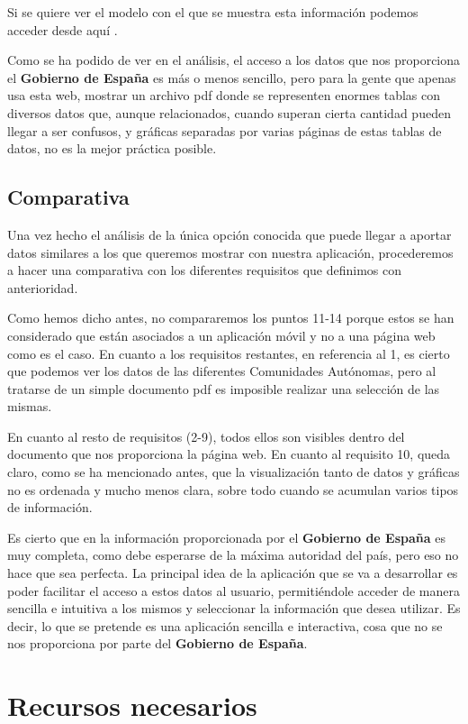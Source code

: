 Si se quiere ver el modelo con el que se muestra esta información podemos acceder desde aquí \cite{actualizacion-gob}.

Como se ha podido de ver en el análisis, el acceso a los datos que nos proporciona el \textbf{Gobierno de España} es más o menos sencillo, pero para la gente que apenas usa esta web, mostrar un archivo pdf donde se representen enormes tablas con diversos datos que, aunque relacionados, cuando superan cierta cantidad pueden llegar a ser confusos, y gráficas separadas por varias páginas de estas tablas de datos, no es la mejor práctica posible.

\subsection{Comparativa}

Una vez hecho el análisis de la única opción conocida que puede llegar a aportar datos similares a los que queremos mostrar con nuestra aplicación, procederemos a hacer una comparativa con los diferentes requisitos que definimos con anterioridad.

Como hemos dicho antes, no compararemos los puntos 11-14 porque estos se han considerado que están asociados a un aplicación móvil y no a una página web como es el caso. En cuanto a los requisitos restantes, en referencia al 1, es cierto que podemos ver los datos de las diferentes Comunidades Autónomas, pero al tratarse de un simple documento pdf es imposible realizar una selección de las mismas.

En cuanto al resto de requisitos (2-9), todos ellos son visibles dentro del documento que nos proporciona la página web. En cuanto al requisito 10, queda claro, como se ha mencionado antes, que la visualización tanto de datos y gráficas no es ordenada y mucho menos clara, sobre todo cuando se acumulan varios tipos de información.

Es cierto que en la información proporcionada por el \textbf{Gobierno de España} es muy completa, como debe esperarse de la máxima autoridad del país, pero eso no hace que sea perfecta. La principal idea de la aplicación que se va a desarrollar es poder facilitar el acceso a estos datos al usuario, permitiéndole acceder de manera sencilla e intuitiva a los mismos y seleccionar la información que desea utilizar. Es decir, lo que se pretende es una aplicación sencilla e interactiva, cosa que no se nos proporciona por parte del \textbf{Gobierno de España}.

\section{Recursos necesarios} \label{sec:recursos}

